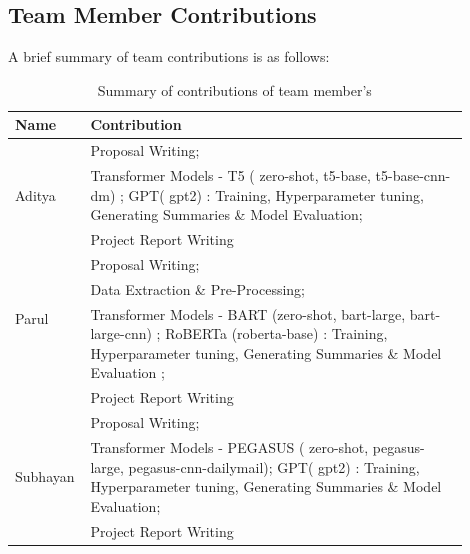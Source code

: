 \documentclass{article}
\begin{document}


\newpage
\begin{appendices}
\section{Team Member Contributions}
A brief summary of team contributions is as follows:

\begin{table}[H]
\caption{Summary of contributions of team member's}
\renewcommand{\arraystretch}{1.5}
	\centering
	\begin{tabular}{|p{0.1\linewidth} | p{0.8\linewidth}|}
		\hline
		{\textbf{Name }} & \textbf{Contribution} \\
		\hline
		\multirow{3}{4em}{Aditya} & Proposal Writing;\\
        & Transformer Models - T5 ( zero-shot,  t5-base, t5-base-cnn-dm) ; GPT( gpt2) : Training, Hyperparameter tuning, Generating Summaries \& Model Evaluation; \\
        & Project Report Writing  \\ 
		\hline
		\multirow{3}{4em}{Parul} & Proposal Writing;  \\
        & Data Extraction \& Pre-Processing; \\
        & Transformer Models - BART (zero-shot, bart-large, bart-large-cnn) ; RoBERTa (roberta-base) : Training, Hyperparameter tuning, Generating Summaries \& Model Evaluation ;  \\
        & Project Report Writing \\ 
		\hline
		\multirow{3}{4em}{Subhayan} & Proposal Writing; \\
        & Transformer Models - PEGASUS ( zero-shot, pegasus-large, pegasus-cnn-dailymail); GPT( gpt2) : Training, Hyperparameter tuning, Generating Summaries \& Model Evaluation; \\
        & Project Report Writing \\ 
		\hline
	\end{tabular}
\end{table}


\end{appendices}
\end{document}
